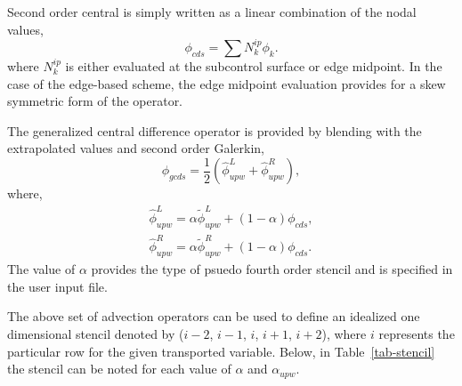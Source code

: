 Second order central is simply written as a linear combination of the nodal values,
\begin{equation}
 \phi_{cds} = \sum N^{ip}_k \phi_k.
\label{phiCentral}
\end{equation}
%
where $N^{ip}_k$ is either evaluated at the subcontrol surface or edge midpoint. In the case
of the edge-based scheme, the edge midpoint evaluation provides for a skew symmetric form
of the operator. 

The generalized central difference operator is provided by blending with the extrapolated values and 
second order Galerkin,
\begin{equation}
 \phi_{gcds} = \frac{1}{2} \left(  \hat\phi^L_{upw} + \hat\phi^R_{upw} \right),
\label{phi4th}
\end{equation}
where,
\begin{eqnarray}
  \hat\phi^L_{upw} = \alpha \tilde \phi^L_{upw} + \left(1-\alpha\right) \phi_{cds}, \nonumber \\
  \hat\phi^R_{upw} = \alpha \tilde \phi^R_{upw} + \left(1-\alpha\right) \phi_{cds}.
\label{advNew4th}
\end{eqnarray}
The value of $\alpha$ provides the type of psuedo fourth order stencil and is specified in the user
input file.

The above set of advection operators can be used to define an idealized one dimensional stencil denoted
by ($i-2$, $i-1$, $i$, $i+1$, $i+2$), where $i$ represents the particular row for the given transported
variable. Below, in Table~\ref{tab-stencil} the stencil can be noted for each value of $\alpha$ and $\alpha_{upw}$.


